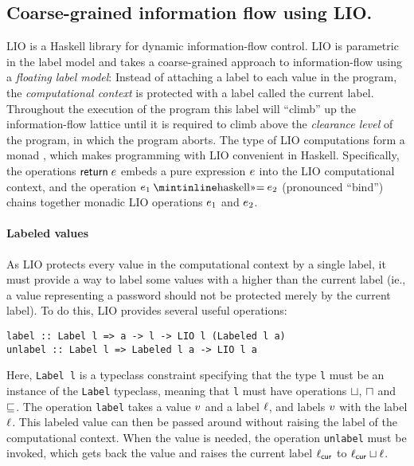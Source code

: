 \subsection{Coarse-grained information flow using LIO.}
LIO \cite{SRMMlio} is a Haskell library for dynamic information-flow control. LIO is parametric in the label model and takes a coarse-grained approach to information-flow using a \emph{floating label model}: Instead of attaching a label to each value in the program, the \emph{computational context} is protected with a label called the current label. Throughout the execution of the program this label will ``climb'' up the information-flow lattice until it is required to climb above the \emph{clearance level} of the program, in which the program aborts. The type of LIO computations form a monad \cite{Wadler:1995:MFP:647698.734146}, which makes programming with LIO convenient in Haskell. Specifically, the operations $\mathsf{return}\;e$ embeds a pure expression $e$ into the LIO computational context, and the operation $\bind{\expr_1}{\expr_2}$ (pronounced ``bind'') chains together monadic LIO operations $e_1$ and $e_2$.

\paragraph{Labeled values}
As LIO protects every value in the computational context by a single label, it must provide a way to label some values with a higher than the current label (ie., a value representing a password should not be protected merely by the current label). To do this, LIO provides several useful operations:
\begin{verbatim}
label :: Label l => a -> l -> LIO l (Labeled l a)
unlabel :: Label l => Labeled l a -> LIO l a
\end{verbatim}
Here, \texttt{Label l} is a typeclass constraint specifying that the type \texttt{l} must be an instance of the \texttt{Label} typeclass, meaning that \texttt{l} must have operations $\sqcup$, $\sqcap$ and $\sqsubseteq$. The operation \texttt{label} takes a value $v$ and a label $\ell$, and labels $v$ with the label $\ell$. This labeled value can then be passed around without raising the label of the computational context. When the value is needed, the operation \texttt{unlabel} must be invoked, which gets back the value and raises the current label $\ell_{\mathsf{cur}}$ to $\ell_{\mathsf{cur}} \sqcup \ell$.

